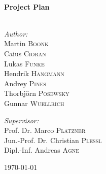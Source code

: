 \begin{titlepage}
\begin{center}
\HRule \\[0.4cm]
{\huge \bfseries Project Plan}\\[0.0cm]
\HRule \\[0.4cm]

\begin{minipage}[t]{0.495\textwidth}
\begin{flushleft} \large
\emph{Author:}\\
Martin \textsc{Boonk}\\
Caius \textsc{Cioran}\\
Lukas \textsc{Funke}\\
Hendrik \textsc{Hangmann}\\
Andrey \textsc{Pines}\\
Thorbj\"orn \textsc{Posewsky}\\
Gunnar \textsc{Wuellrich}
\end{flushleft}
\end{minipage}
\hfill
\begin{minipage}[t]{0.495\textwidth}
\begin{flushright} \large
\emph{Supervisor:}\\
Prof. Dr. Marco \textsc{Platzner}\\
Jun.-Prof. Dr. Christian \textsc{Plessl}\\
Dipl.-Inf. Andreas \textsc{Agne}
\end{flushright}
\end{minipage}

\vfill

{\large \today}

\end{center}

\end{titlepage}